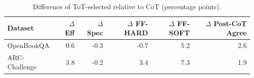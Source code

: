 \begin{table}[H]
\centering
\caption{Difference of ToT-selected relative to CoT (percentage points).}
\label{tab:cot-tot-deltas}
\begin{tabular}{lrrrrr}
\toprule
Dataset & $\Delta$ Eff & $\Delta$ Spec & $\Delta$ FF-HARD & $\Delta$ FF-SOFT & $\Delta$ Post-CoT Agree \\
\midrule
OpenBookQA & 0.6 & -0.3 & -0.7 & 5.2 & 2.6 \\
ARC-Challenge & 3.8 & -0.2 & 3.4 & 7.3 & 1.9 \\
\bottomrule
\end{tabular}
\end{table}
